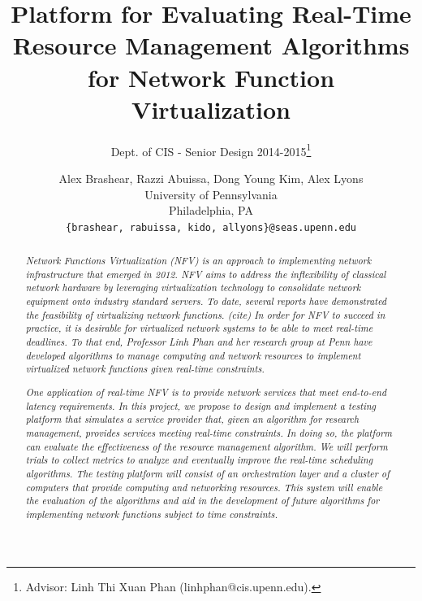 \documentclass{sig-alternate}
\begin{document}
\title{Platform for Evaluating Real-Time Resource Management Algorithms for Network Function Virtualization}
\subtitle{Dept. of CIS - Senior Design 2014-2015\thanks{Advisor: Linh Thi Xuan Phan (linhphan@cis.upenn.edu).}}
\author{
\alignauthor Alex Brashear, Razzi Abuissa, Dong Young Kim, Alex Lyons\\
\vspace{.4cm}
University of Pennsylvania\\
Philadelphia, PA \\
\vspace{.4cm}
\texttt{\{brashear, rabuissa, kido, allyons\}@seas.upenn.edu}
}

\date{}
\maketitle

\begin{abstract}
 \textit{Network Functions Virtualization (NFV) is an approach to implementing network infrastructure that emerged in 2012. NFV aims to address the inflexibility of classical network hardware by leveraging virtualization technology to consolidate network equipment onto industry standard servers. To date, several reports have demonstrated the feasibility of virtualizing network functions. (cite) In order for NFV to succeed in practice, it is desirable for virtualized network systems to be able to meet real-time deadlines. To that end, Professor Linh Phan and her research group at Penn have developed algorithms to manage computing and network resources to implement virtualized network functions given real-time constraints.}

 \textit{One application of real-time NFV is to provide network services that meet end-to-end latency requirements. In this project, we propose to design and implement a testing platform that simulates a service provider that, given an algorithm for research management, provides services meeting real-time constraints. In doing so, the platform can evaluate the effectiveness of the resource management algorithm. We will perform trials to collect metrics to analyze and eventually improve the real-time scheduling algorithms. The testing platform will consist of an orchestration layer and a cluster of computers that provide computing and networking resources. This system will enable the evaluation of the algorithms and aid in the development of future algorithms for implementing network functions subject to time constraints.}
\end{abstract}
\end{document}
